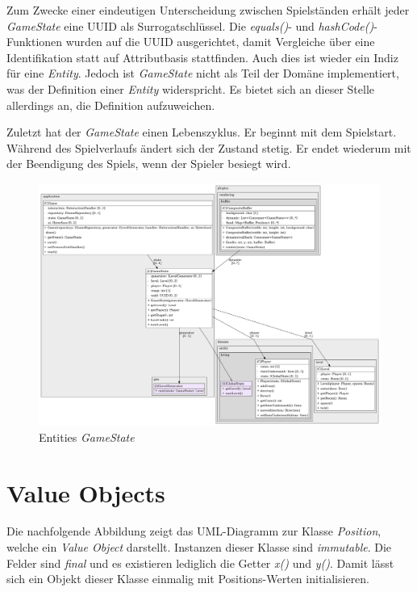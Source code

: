 Zum Zwecke einer eindeutigen Unterscheidung zwischen Spielständen
erhält jeder \textit{GameState} eine UUID als Surrogatschlüssel.
Die \textit{equals()}- und \textit{hashCode()}-Funktionen wurden auf
die UUID ausgerichtet, damit Vergleiche über eine Identifikation
statt auf Attributbasis stattfinden. Auch dies ist wieder ein Indiz
für eine \textit{Entity}. Jedoch ist \textit{GameState} nicht als Teil der
Domäne implementiert, was der Definition einer \textit{Entity}
widerspricht. Es bietet sich an dieser Stelle allerdings an, die
Definition aufzuweichen.

Zuletzt hat der \textit{GameState} einen Lebenszyklus. Er beginnt mit
dem Spielstart. Während des Spielverlaufs ändert sich der Zustand
stetig. Er endet wiederum mit der Beendigung des Spiels, wenn der
Spieler besiegt wird.

\vspace{0.5cm}
\begin{figure}[H]
    \centering
    \includegraphics[width=1\linewidth]{Bilder/Visualisierung/GameState_structure.png}
    \caption{Entities \textit{GameState}}
\end{figure}

\section{Value Objects}
Die nachfolgende Abbildung zeigt das UML-Diagramm zur Klasse
\textit{Position}, welche ein \textit{Value Object} darstellt.
Instanzen dieser Klasse sind \textit{immutable}. Die Felder sind
\textit{final} und es existieren lediglich die Getter \textit{x()}
und \textit{y()}. Damit lässt sich ein Objekt dieser Klasse einmalig
mit Positions-Werten initialisieren. 

